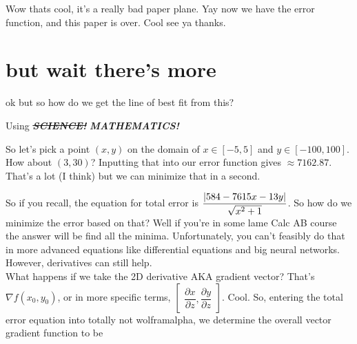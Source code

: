\documentclass[a4paper]{article}
\begin{document}
Wow thats cool, it's a really bad paper plane. Yay now we have the error function, and this paper is over. Cool see ya thanks.


\section*{but wait there's more}

ok but so how do we get the line of best fit from this?

\renewcommand{\ULthickness}{2.0pt}%
Using \sout{\textbf{\textit{SCIENCE!}}} \textbf{\textit{MATHEMATICS!}}
\renewcommand{\ULthickness}{.4pt}%

So let's pick a point $(x, y)$ on the domain of $x\in[-5, 5]$ and $y\in[-100,100]$.\\

How about $(3, 30)$? Inputting that into our error function gives $\approx7162.87$. That's a lot (I think) but we can minimize that in a second.



So if you recall, the equation for total error is $\dfrac{\lvert584 - 7615x - 13y\rvert}{\sqrt{x^2+1}}$. So how do we minimize the error based on that? Well if you're in some lame Calc AB course the answer will be find all the minima. Unfortunately, you can't feasibly do that in more advanced equations like differential equations and big neural networks. However, derivatives can still help.\\

What happens if we take the 2D derivative AKA gradient vector? That's $\nabla f(x_0, y_0)$, or in more specific terms,
$\begin{bmatrix}
\dfrac{\partial x}{\partial z}, \dfrac{\partial y}{\partial z}
\end{bmatrix}$.
Cool. So, entering the total error equation into totally not wolframalpha, we determine the overall vector gradient function to be
\end{document}
